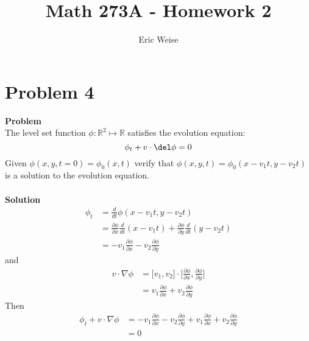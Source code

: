 \documentclass{article}
\title{Math 273A - Homework 2}
\author{Eric Weise}
\begin{document}
\maketitle

\section*{Problem 4}
{\bf Problem}\\
The level set function \( \phi : \mathbb{R}^{2} \mapsto \mathbb{R} \) satisfies the evolution equation:
\[ \phi_{t} + v \cdot \del \phi = 0 \]
Given 
\( \phi(x,y,t=0) = \phi_{0}(x,t) \) 
verify that 
\( \phi(x,y,t) = \phi_{0}(x-v_{1}t,y-v_{2}t) \)
is a solution to the evolution equation.\\
\\
{\bf Solution }\\
\begin{align*}
    \phi_{t} 
    & = \frac{d}{dt} \phi(x-v_{1}t,y-v_{2}t) \\
    & = \frac{\partial \phi}{\partial x}\frac{d}{dt} (x-v_{1}t) + \frac{\partial \phi}{\partial y} \frac{d}{dt} (y-v_{2}t) \\
    & = -v_{1} \frac{\partial \phi}{\partial x} - v_{2} \frac{\partial \phi}{\partial  y}
\end{align*}
and 
\begin{align*}
    v \cdot \nabla \phi
    & = \big[v_{1},v_{2} \big] \cdot \Big[ \frac{\partial \phi}{\partial x} , \frac{\partial \phi}{\partial y} \Big] \\
    & = v_{1} \frac{\partial \phi}{\partial x} + v_{2} \frac{\partial \phi}{\partial y}
\end{align*}
Then
\begin{align*}
    \phi_{t} + v \cdot \nabla \phi
    & = -v_{1} \frac{\partial \phi}{\partial x} - v_{2} \frac{\partial \phi}{\partial  y}
    + v_{1} \frac{\partial \phi}{\partial x} + v_{2} \frac{\partial \phi}{\partial y}\\
    & = 0
\end{align*}
\end{document}

